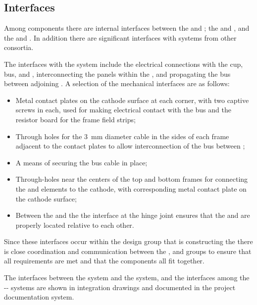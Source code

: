 \subsection{Interfaces}
\label{sec:fdsp-hv-interface}

Among  components there are internal interfaces between the  and ; the  and , and  the  and . In addition there are significant interfaces with systems from other consortia.

The interfaces with the  system include the electrical connections with the  cup,  bus, and , interconnecting the panels within the , and propagating the  bus between adjoining .  A selection of the mechanical interfaces are as follows:
\begin{itemize}
\item Metal contact plates on the cathode surface at each corner, with two captive screws in each, used for making electrical contact with the  bus and the resistor board for the frame field strips;
\item Through holes for the \SI{3}{\milli\m} diameter cable in the sides of each frame adjacent to the contact plates to allow interconnection of the  bus between ;
\item A means of securing the  bus cable in place;
\item Through-holes near the centers of the top and bottom frames for connecting the  and  elements to the cathode, with corresponding metal contact plate on the cathode surface;
\item Between the  and the  the interface at the hinge joint ensures that the  and  are properly located relative to each other.
\end{itemize}
Since these interfaces occur within the design group that is constructing the  there is close coordination and communication between the ,  and  groups to ensure that all requirements are met and that the components all fit together.

The interfaces between the  system and the  system, and the interfaces among the -- systems are shown in integration drawings and documented in the project documentation system. 

